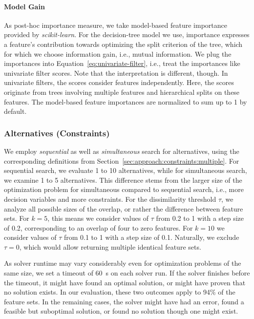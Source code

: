 \documentclass{article}
\theoremstyle{definition}
\begin{document}
\paragraph{Model Gain}

As post-hoc importance measure, we take model-based feature importance provided by \emph{scikit-learn}.
For the decision-tree model we use, importance expresses a feature's contribution towards optimizing the split criterion of the tree, which for which we choose information gain, i.e., mutual information.
We plug the importances into Equation~\ref{eq:univariate-filter}, i.e., treat the importances like univariate filter scores.
Note that the interpretation is different, though.
In univariate filters, the scores consider features independently.
Here, the scores originate from trees involving multiple features and hierarchical splits on these features.
The model-based feature importances are normalized to sum up to 1 by default.

\subsubsection{Alternatives (Constraints)}
\label{sec:experimental-design:approaches:alternatives}

We employ \emph{sequential} as well as \emph{simultaneous} search for alternatives, using the corresponding definitions from Section~\ref{sec:approach:constraints:multiple}.
For sequential search, we evaluate 1 to 10 alternatives, while for simultaneous search, we examine 1 to 5 alternatives.
This difference stems from the larger size of the optimization problem for simultaneous compared to sequential search, i.e., more decision variables and more constraints.
For the dissimilarity threshold $\tau$, we analyze all possible sizes of the overlap, or rather the difference between feature sets.
For $k=5$, this means we consider values of $\tau$ from 0.2 to 1 with a step size of 0.2, corresponding to an overlap of four to zero features.
For $k=10$ we consider values of $\tau$ from 0.1 to 1 with a step size of 0.1.
Naturally, we exclude $\tau = 0$, which would allow returning multiple identical feature sets.

As solver runtime may vary considerably even for optimization problems of the same size, we set a timeout of 60~s on each solver run.
If the solver finishes before the timeout, it might have found an optimal solution, or might have proven that no solution exists.
In our evaluation, these two outcomes apply to 94\% of the feature sets.
In the remaining cases, the solver might have had an error, found a feasible but suboptimal solution, or found no solution though one might exist.
\end{document}
